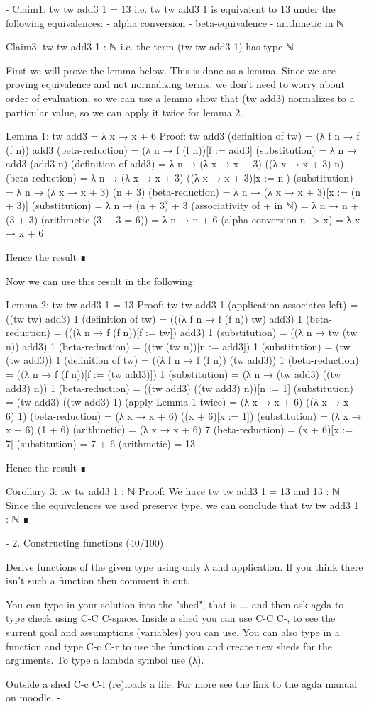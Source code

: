 {-
Claim1: tw tw add3 1 = 13
i.e. tw tw add3 1 is equivalent to 13 under the following equivalences:
  - alpha conversion
  - beta-equivalence
  - arithmetic in ℕ

Claim3: tw tw add3 1 : ℕ
i.e. the term (tw tw add3 1) has type ℕ

First we will prove the lemma below. This is done as a lemma. Since we are
proving equivalence and not normalizing terms, we don't need to worry about
order of evaluation, so we can use a lemma show that (tw add3) normalizes to a particular value, so we can apply it twice for lemma 2.

Lemma 1: tw add3 = λ x → x + 6
Proof:
  tw add3
 (definition of tw)
= (λ f n → f (f n)) add3
 (beta-reduction)
= (λ n → f (f n))[f := add3]
 (substitution)
= λ n → add3 (add3 n)
 (definition of add3)
= λ n → (λ x → x + 3) ((λ x → x + 3) n)
 (beta-reduction)
= λ n → (λ x → x + 3) ((λ x → x + 3)[x := n])
 (substitution)
= λ n → (λ x → x + 3) (n + 3)
 (beta-reduction)
= λ n → (λ x → x + 3)[x := (n + 3)]
 (substitution)
= λ n → (n + 3) + 3
 (associativity of + in ℕ)
= λ n → n + (3 + 3)
 (arithmetic (3 + 3 = 6))
= λ n → n + 6
 (alpha conversion n -> x)
= λ x → x + 6

Hence the result ∎

Now we can use this result in the following:

Lemma 2: tw tw add3 1 = 13
Proof:
  tw tw add3 1
 (application associates left)
= ((tw tw) add3) 1
 (definition of tw)
= (((λ f n → f (f n)) tw) add3) 1
 (beta-reduction)
= (((λ n → f (f n))[f := tw]) add3) 1
 (substitution)
= ((λ n → tw (tw n)) add3) 1
 (beta-reduction)
= ((tw (tw n))[n := add3]) 1
 (substitution)
= (tw (tw add3)) 1
 (definition of tw)
= ((λ f n → f (f n)) (tw add3)) 1
 (beta-reduction)
= ((λ n → f (f n))[f := (tw add3)]) 1
 (substitution)
= (λ n → (tw add3) ((tw add3) n)) 1
 (beta-reduction)
= ((tw add3) ((tw add3) n))[n := 1]
 (substitution)
= (tw add3) ((tw add3) 1)
 (apply Lemma 1 twice)
= (λ x → x + 6) ((λ x → x + 6) 1)
 (beta-reduction)
= (λ x → x + 6) ((x + 6)[x := 1])
 (substitution)
= (λ x → x + 6) (1 + 6)
 (arithmetic)
= (λ x → x + 6) 7
 (beta-reduction)
= (x + 6)[x := 7]
 (substitution)
= 7 + 6
 (arithmetic)
= 13

Hence the result ∎

Corollary 3: tw tw add3 1 : ℕ
Proof:
We have tw tw add3 1 = 13 and 13 : ℕ
Since the equivalences we used preserve type, we can conclude that tw tw add3 1 : ℕ ∎
-}

{-
2. Constructing functions (40/100)

Derive functions of the given type using only λ and application.
If you think there isn't such a function then comment it out.

You can type in your solution into the "shed", that is {..}.
and then ask agda to type check using C-C C-space.
Inside a shed you can use C-C C-, to see the surrent goal and assumptions (variables) you can use.
You can also type in a function and type C-c C-r to use the function and create new sheds for the arguments.
To type a lambda symbol use \Gl (λ).

Outside a shed C-c C-l (re)loads a file.
For more see the link to the agda manual on moodle.
-}

